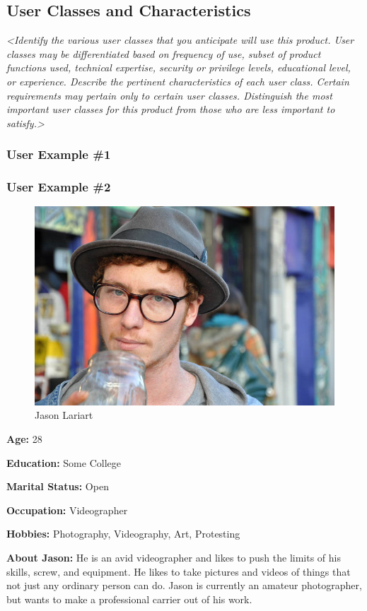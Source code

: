 \documentclass[english]{article}
\numberwithin{equation}{section} %
\begin{document}
\subsection{User Classes and Characteristics}
\textit{<Identify the various user classes that you anticipate will use this product. User classes may be differentiated based on frequency of use, subset of product functions used, technical expertise, security or privilege levels, educational level, or experience. Describe the pertinent characteristics of each user class. Certain requirements may pertain only to certain user classes. Distinguish the most important user classes for this product from those who are less important to satisfy.>}
\subsubsection{User Example \#1}
\subsubsection{User Example \#2}

\begin{figure}[h!]
  \centering
	\includegraphics[scale=1]{hipster1.jpg}
  \caption{Jason Lariart}
\end{figure}

\textbf{ Age:} 28

\textbf{ Education:} Some College

\textbf{ Marital Status:} Open

\textbf{ Occupation:} Videographer

\textbf{ Hobbies:} Photography, Videography, Art, Protesting

\textbf{About Jason:} He is an avid videographer and likes to push the limits of his skills, screw, and equipment. He likes to take pictures and videos of things that not just any ordinary person can do. Jason is currently an amateur photographer, but wants to make a professional carrier out of his work.
\\
\end{document}
